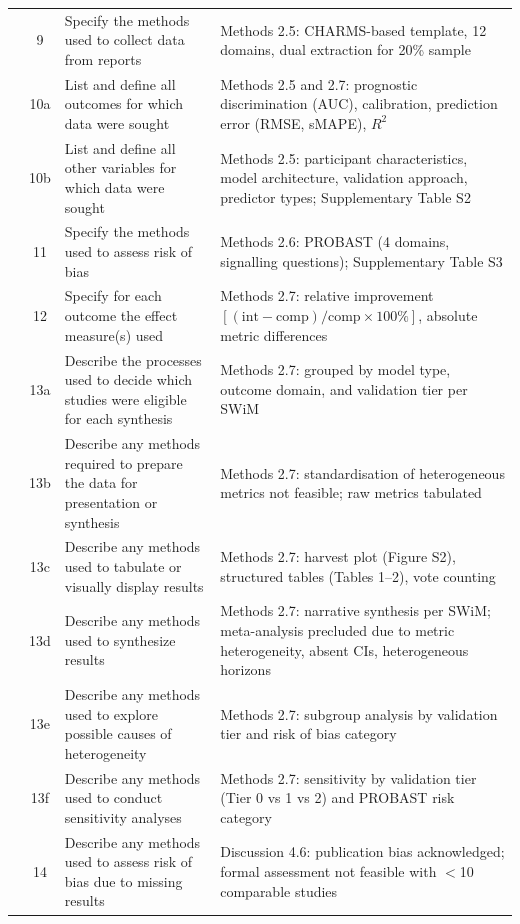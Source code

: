 \documentclass[11pt,a4paper]{article}
\begin{document}
\begin{small}
\begin{longtable}{@{}p{1.8cm}cp{5cm}p{6.5cm}@{}}
         & 9  & Specify the methods used to collect data from reports & Methods 2.5: CHARMS-based template, 12 domains, dual extraction for 20\% sample \\
         & 10a & List and define all outcomes for which data were sought & Methods 2.5 and 2.7: prognostic discrimination (AUC), calibration, prediction error (RMSE, sMAPE), $R^2$ \\
         & 10b & List and define all other variables for which data were sought & Methods 2.5: participant characteristics, model architecture, validation approach, predictor types; Supplementary Table S2 \\
         & 11 & Specify the methods used to assess risk of bias & Methods 2.6: PROBAST (4 domains, signalling questions); Supplementary Table S3 \\
         & 12 & Specify for each outcome the effect measure(s) used & Methods 2.7: relative improvement $[(\text{int} - \text{comp})/\text{comp} \times 100\%]$, absolute metric differences \\
         & 13a & Describe the processes used to decide which studies were eligible for each synthesis & Methods 2.7: grouped by model type, outcome domain, and validation tier per SWiM \\
         & 13b & Describe any methods required to prepare the data for presentation or synthesis & Methods 2.7: standardisation of heterogeneous metrics not feasible; raw metrics tabulated \\
         & 13c & Describe any methods used to tabulate or visually display results & Methods 2.7: harvest plot (Figure S2), structured tables (Tables 1--2), vote counting \\
         & 13d & Describe any methods used to synthesize results & Methods 2.7: narrative synthesis per SWiM; meta-analysis precluded due to metric heterogeneity, absent CIs, heterogeneous horizons \\
         & 13e & Describe any methods used to explore possible causes of heterogeneity & Methods 2.7: subgroup analysis by validation tier and risk of bias category \\
         & 13f & Describe any methods used to conduct sensitivity analyses & Methods 2.7: sensitivity by validation tier (Tier 0 vs 1 vs 2) and PROBAST risk category \\
         & 14 & Describe any methods used to assess risk of bias due to missing results & Discussion 4.6: publication bias acknowledged; formal assessment not feasible with $<$10 comparable studies \\

\end{longtable}
\end{small}
\end{document}
